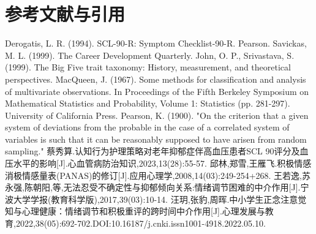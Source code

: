 \documentclass[withoutpreface,bwprint]{cumcmthesis} %
\begin{document}
\section{参考文献与引用}

\begin{thebibliography}{9}%
     Derogatis, L. R. (1994). SCL-90-R: Symptom Checklist-90-R. Pearson.
     Savickas, M. L. (1999). The Career Development Quarterly.
     John, O. P., Srivastava, S. (1999). The Big Five trait taxonomy: History, measurement, and theoretical perspectives.
    MacQueen, J. (1967). Some methods for classification and analysis of multivariate observations. In Proceedings of the Fifth Berkeley Symposium on Mathematical Statistics and Probability, Volume 1: Statistics (pp. 281-297). University of California Press.
    Pearson, K. (1900). "On the criterion that a given system of deviations from the probable in the case of a correlated system of variables is such that it can be reasonably supposed to have arisen from random sampling."
     蔡秀算.认知行为护理策略对老年抑郁症伴高血压患者SCL 90评分及血压水平的影响[J].心血管病防治知识,2023,13(28):55-57.
     邱林,郑雪,王雁飞.积极情感消极情感量表(PANAS)的修订[J].应用心理学,2008,14(03):249-254+268.
     王若逸,苏永强,陈朝阳,等,无法忍受不确定性与抑郁倾向关系:情绪调节困难的中介作用[J].宁波大学学报(教育科学版),2017,39(03):10-14.
     汪玥,张豹,周晖.中小学生正念注意觉知与心理健康：情绪调节和积极重评的跨时间中介作用[J].心理发展与教育,2022,38(05):692-702.DOI:10.16187/j.cnki.issn1001-4918.2022.05.10.
\end{thebibliography}
\end{document}
